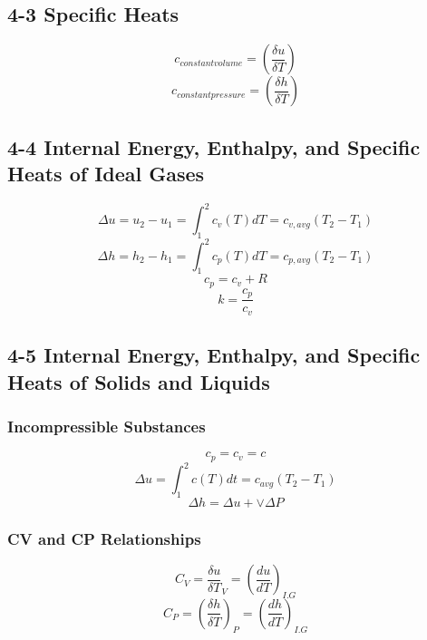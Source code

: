 \documentclass[10pt,landscape]{article}
\begin{document}
\begin{multicols}{3}
\subsection{4-3 Specific Heats}
\begin{equation}
    c_{constant volume}=(\frac{\delta u}{\delta T})
\end{equation}
\begin{equation}
    c_{constant pressure}=(\frac{\delta h}{\delta T})
\end{equation}
\subsection{4-4 Internal Energy, Enthalpy, and Specific Heats of Ideal Gases}
\begin{equation}
    \Delta u=u_2-u_1=\int^2_1c_v(T)dT=c_{v,avg}(T_2-T_1)
\end{equation}
\begin{equation}
    \Delta h=h_2-h_1=\int^2_1c_p(T)dT=c_{p,avg}(T_2-T_1)
\end{equation}
\begin{equation}
    c_p=c_v+R
\end{equation}
\begin{equation}
    k=\frac{c_p}{c_v}
\end{equation}
\subsection{4-5 Internal Energy, Enthalpy, and Specific Heats of Solids and Liquids}
\subsubsection{Incompressible Substances}
\begin{equation}
    c_p=c_v=c
\end{equation}
\begin{equation}
    \Delta u=\int^2_1c(T)dt=c_{avg}(T_2-T_1)
\end{equation}
\begin{equation}
     \Delta h = \Delta u + \vee\Delta P
\end{equation}
\subsubsection{CV and CP Relationships}
\begin{equation}
    C_V=\frac{\delta u}{\delta T}_V=(\frac{du}{dT})_{I.G}
\end{equation}
\begin{equation}
    C_P=(\frac{\delta h}{\delta T})_P=(\frac{dh}{dT})_{I.G}
\end{equation}


\end{multicols}
\end{document}
